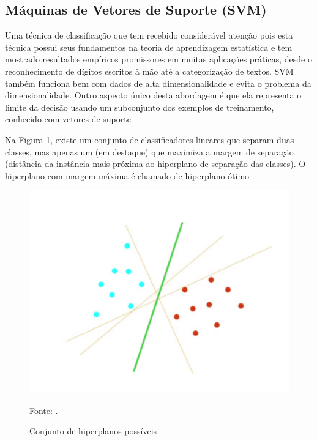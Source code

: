 \documentclass[
	12pt,				%
	openright,			%
	oneside,	
	a4paper,				%
	english,				%
	brazil				%
]{abntex2/abntex2} %
\begin{document}
	\subsection{Máquinas de Vetores de Suporte (SVM)}
	
	Uma técnica de classificação que tem recebido considerável atenção pois esta técnica possui seus fundamentos na teoria de aprendizagem estatística e tem mostrado resultados empíricos promissores em muitas aplicações práticas, desde o reconhecimento de dígitos escritos à mão até a categorização de textos. SVM também funciona bem com dados de alta dimensionalidade e evita o problema da dimensionalidade. Outro aspecto único desta abordagem é que ela representa o limite da decisão usando um subconjunto dos exemplos de treinamento, conhecido com vetores de suporte \cite{tan:2009}.
	
	Na Figura \ref{figsvmHiperPlanos}, existe um conjunto de classificadores lineares que separam duas classes, mas apenas um (em destaque) que maximiza a margem de separação (distância da instância mais próxima ao hiperplano de separação das classes). O hiperplano com margem máxima é chamado de hiperplano ótimo \cite{junior:2010}.
	\\
	\begin{figure}[!htb]
		\caption{\label{figsvmHiperPlanos} Conjunto de hiperplanos possíveis}
		\begin{center}
			\includegraphics[scale=0.5]{img/svmHiperPlanos.png}
		\end{center}
		Fonte: \cite{junior:2010}.
	\end{figure}
	
\end{document}
